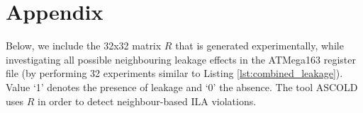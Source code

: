 \documentclass[runningheads, a4paper, 10pt]{llncs}
\begin{document}











\newpage
\section{Appendix}
Below, we include the 32x32 matrix $R$ that is generated experimentally, while investigating all possible neighbouring leakage effects in the ATMega163 register file (by performing 32 experiments similar to Listing \ref{lst:combined_leakage}). Value `1' denotes the presence of leakage and `0' the absence. The tool ASCOLD uses $R$ in order to detect neighbour-based ILA violations.\\
\end{document}
